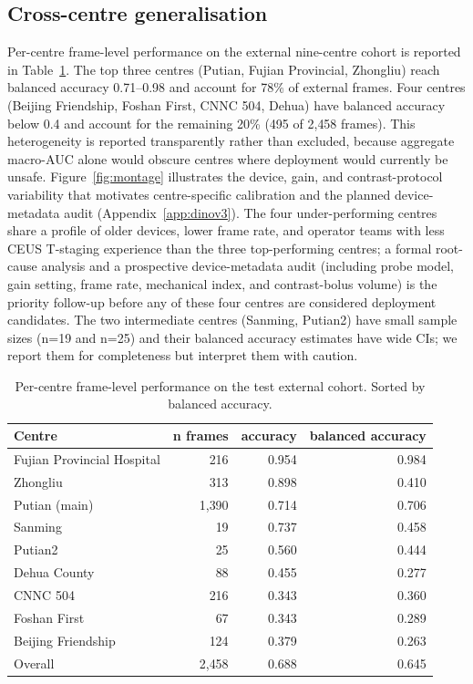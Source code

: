 \documentclass[11pt,a4paper]{article}
\begin{document}
\subsection{Cross-centre generalisation}

Per-centre frame-level performance on the external nine-centre cohort is reported in Table~\ref{tab:percentre}. The top three centres (Putian, Fujian Provincial, Zhongliu) reach balanced accuracy 0.71--0.98 and account for 78\% of external frames. Four centres (Beijing Friendship, Foshan First, CNNC 504, Dehua) have balanced accuracy below 0.4 and account for the remaining 20\% (495 of 2{,}458 frames). This heterogeneity is reported transparently rather than excluded, because aggregate macro-AUC alone would obscure centres where deployment would currently be unsafe. Figure~\ref{fig:montage} illustrates the device, gain, and contrast-protocol variability that motivates centre-specific calibration and the planned device-metadata audit (Appendix~\ref{app:dinov3}). The four under-performing centres share a profile of older devices, lower frame rate, and operator teams with less CEUS T-staging experience than the three top-performing centres; a formal root-cause analysis and a prospective device-metadata audit (including probe model, gain setting, frame rate, mechanical index, and contrast-bolus volume) is the priority follow-up before any of these four centres are considered deployment candidates. The two intermediate centres (Sanming, Putian2) have small sample sizes (n=19 and n=25) and their balanced accuracy estimates have wide CIs; we report them for completeness but interpret them with caution.

\begin{table}[t]
\caption{Per-centre frame-level performance on the test external cohort. Sorted by balanced accuracy.}
\label{tab:percentre}
\centering
\begin{tabular}{lrrr}
\toprule
\textbf{Centre} & \textbf{n frames} & \textbf{accuracy} & \textbf{balanced accuracy} \\
\midrule
Fujian Provincial Hospital & 216 & 0.954 & 0.984 \\
Zhongliu                   & 313 & 0.898 & 0.410 \\
Putian (main)              & 1{,}390 & 0.714 & 0.706 \\
Sanming                    & 19  & 0.737 & 0.458 \\
Putian2                    & 25  & 0.560 & 0.444 \\
Dehua County               & 88  & 0.455 & 0.277 \\
CNNC 504                   & 216 & 0.343 & 0.360 \\
Foshan First               & 67  & 0.343 & 0.289 \\
Beijing Friendship         & 124 & 0.379 & 0.263 \\
\midrule
Overall                    & 2{,}458 & 0.688 & 0.645 \\
\bottomrule
\end{tabular}
\end{table}
\end{document}
